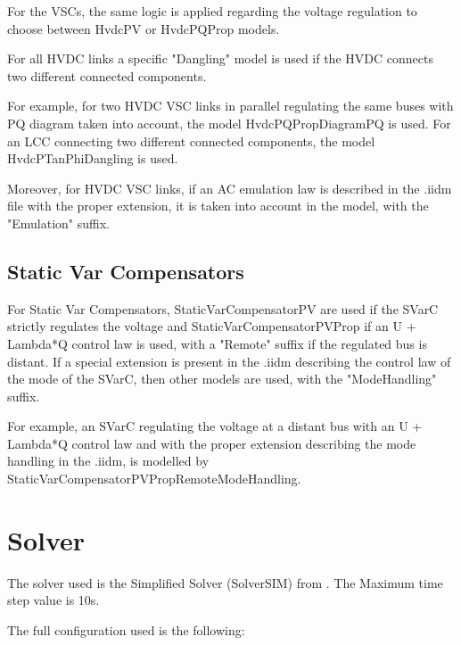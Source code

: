 \documentclass[a4paper, 12pt]{report}
\begin{document}
\par For the VSCs, the same logic is applied regarding the voltage regulation to choose between HvdcPV or HvdcPQProp models.

\par For all HVDC links a specific "Dangling" model is used if the HVDC connects two different connected components.

\par For example, for two HVDC VSC links in parallel regulating the same buses with PQ diagram taken into account, the model HvdcPQPropDiagramPQ is used. For an LCC connecting two different connected components, the model HvdcPTanPhiDangling is used.

\par Moreover, for HVDC VSC links, if an AC emulation law is described in the .iidm file with the proper extension, it is taken into account in the model, with the "Emulation" suffix.

\subsection{Static Var Compensators}
\par For Static Var Compensators, StaticVarCompensatorPV are used if the SVarC strictly regulates the voltage and StaticVarCompensatorPVProp if an U + Lambda*Q control law is used, with a "Remote" suffix if the regulated bus is distant. If a special extension is present in the .iidm describing the control law of the mode of the SVarC, then other models are used, with the "ModeHandling" suffix.

\par For example, an SVarC regulating the voltage at a distant bus with an U + Lambda*Q control law and with the proper extension describing the mode handling in the .iidm, is modelled by StaticVarCompensatorPVPropRemoteModeHandling.

\section{Solver}

The solver used is the Simplified Solver (SolverSIM) from \Dynawo.
The Maximum time step value is 10s.

The full configuration used is the following:


\end{document}
